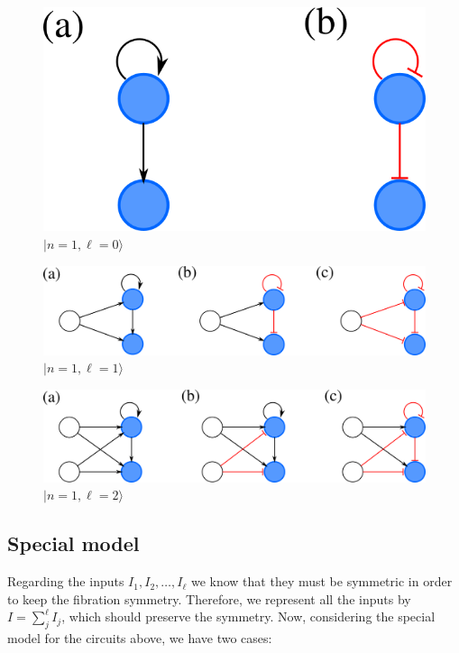 \documentclass[12pt]{article}
\begin{document}
\begin{figure}[H]
    \centering
    \includegraphics[scale=0.5]{figs/n1l0_ecoli.png}
    \caption{$|n=1, \ell = 0\rangle$}
    \label{fig:fig2_l0}
\end{figure}

\begin{figure}[H]
    \centering
    \includegraphics[scale=0.5]{figs/n1l1_ecoli.png}
    \caption{$|n=1, \ell = 1\rangle$}
    \label{fig:fig2_l1}
\end{figure}

\begin{figure}[H]
    \centering
    \includegraphics[scale=0.5]{figs/n1l2_ecoli.png}
    \caption{$|n=1, \ell = 2\rangle$}
    \label{fig:fig2_l2}
\end{figure}

\subsection{Special model}

Regarding the inputs $I_1, I_2, \dots, I_{\ell}$
we know that they must be symmetric in order to keep
the fibration symmetry. Therefore, we represent all
the inputs by $I = \sum_j^{\ell} I_j$, which should
preserve the symmetry. Now, considering the special
model for the circuits above, we have two cases:\\[0.2cm]
\end{document}
